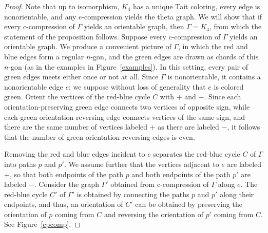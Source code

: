\documentclass[11pt, oneside]{amsart}
\theoremstyle{theorem}
\theoremstyle{definition}
\theoremstyle{theorem}
\begin{document}
\begin{proof}
Note that up to isomorphism, $K_4$ has a unique Tait coloring, every edge is nonorientable, and any c-compression yields the theta graph.  We will show that if every c-compression of $\Gamma$ yields an orientable graph, then $\Gamma = K_4$, from which the statement of the proposition follows.  Suppose every c-compression of $\Gamma$ yields an orientable graph.  We produce a convenient picture of $\Gamma$, in which the red and blue edges form a regular $n$-gon, and the green edges are drawn as chords of this $n$-gon (as in the examples in Figure~\ref{examples}).  In this setting, every pair of green edges meets either once or not at all.  Since $\Gamma$ is nonorientable, it contains a nonorientable edge $e$; we suppose without loss of generality that $e$ is colored green.  Orient the vertices of the red-blue cycle $C$ with $+$ and $-$.  Since each orientation-preserving green edge connects two vertices of opposite sign, while each green orientation-reversing edge connects vertices of the same sign, and there are the same number of vertices labeled $+$ as there are labeled $-$, it follows that the number of green orientation-reversing edges is even.  

Removing the red and blue edges incident to $e$ separates the red-blue cycle $C$ of $\Gamma$ into paths $p$ and $p'$.  We assume further that the vertices adjacent to $e$ are labeled $+$, so that both endpoints of the path $p$ and both endpoints of the path $p'$ are labeled $-$.  Consider the graph $\Gamma'$ obtained from c-compression of $\Gamma$ along $e$.  The red-blue cycle $C'$ of $\Gamma'$ is obtained by connecting the paths $p$ and $p'$ along their endpoints, and thus, an orientation of $C'$ can be obtained by preserving the orientation of $p$ coming from $C$ and reversing the orientation of $p'$ coming from $C$.  See Figure~\ref{cpcomp}.


\end{proof}
\end{document}
